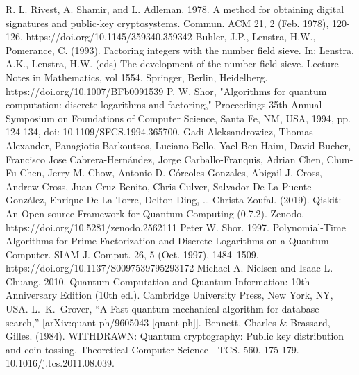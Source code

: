 \documentclass[12pt]{article}
\begin{document}
\begin{thebibliography}{00}
     R. L. Rivest, A. Shamir, and L. Adleman. 1978. A method for obtaining digital signatures and public-key cryptosystems. Commun. ACM 21, 2 (Feb. 1978), 120-126. https://doi.org/10.1145/359340.359342
     Buhler, J.P., Lenstra, H.W., Pomerance, C. (1993). Factoring integers with the number field sieve. In: Lenstra, A.K., Lenstra, H.W. (eds) The development of the number field sieve. Lecture Notes in Mathematics, vol 1554. Springer, Berlin, Heidelberg. https://doi.org/10.1007/BFb0091539
     P. W. Shor, "Algorithms for quantum computation: discrete logarithms and factoring," Proceedings 35th Annual Symposium on Foundations of Computer Science, Santa Fe, NM, USA, 1994, pp. 124-134, doi: 10.1109/SFCS.1994.365700.
     Gadi Aleksandrowicz, Thomas Alexander, Panagiotis Barkoutsos, Luciano Bello, Yael Ben-Haim, David Bucher, Francisco Jose Cabrera-Hernández, Jorge Carballo-Franquis, Adrian Chen, Chun-Fu Chen, Jerry M. Chow, Antonio D. Córcoles-Gonzales, Abigail J. Cross, Andrew Cross, Juan Cruz-Benito, Chris Culver, Salvador De La Puente González, Enrique De La Torre, Delton Ding, … Christa Zoufal. (2019). Qiskit: An Open-source Framework for Quantum Computing (0.7.2). Zenodo. https://doi.org/10.5281/zenodo.2562111
     Peter W. Shor. 1997. Polynomial-Time Algorithms for Prime Factorization and Discrete Logarithms on a Quantum Computer. SIAM J. Comput. 26, 5 (Oct. 1997), 1484–1509. https://doi.org/10.1137/S0097539795293172
     Michael A. Nielsen and Isaac L. Chuang. 2010. Quantum Computation and Quantum Information: 10th Anniversary Edition (10th ed.). Cambridge University Press, New York, NY, USA.
     L.~K.~Grover,
    ``A Fast quantum mechanical algorithm for database search,''
    [arXiv:quant-ph/9605043 [quant-ph]].
     Bennett, Charles \& Brassard, Gilles. (1984). WITHDRAWN: Quantum cryptography: Public key distribution and coin tossing. Theoretical Computer Science - TCS. 560. 175-179. 10.1016/j.tcs.2011.08.039.
\end{thebibliography}
\end{document}
